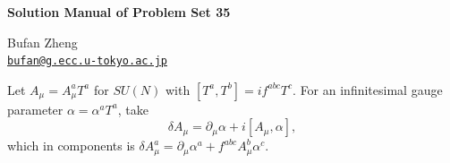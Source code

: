 \resetproblem\textsf{\textsf{}}
\begin{center}
    {\LARGE \textbf{Solution Manual of Problem Set 35} \par}
    \vspace{1em}
    {\large Bufan Zheng\\ \href{mailto:bufan@g.ecc.u-tokyo.ac.jp}{\texttt{bufan@g.ecc.u-tokyo.ac.jp}} \par}
\end{center}

\noindent Let \(A_\mu=A_\mu^aT^a\) for \(SU(N)\) with \([T^a,T^b]=if^{abc}T^c\). For an infinitesimal gauge parameter \(\alpha=\alpha^aT^a\), take
\[
    \delta A_\mu=\partial_\mu\alpha+i[A_\mu,\alpha],
\]
which in components is \(\delta A_\mu^a=\partial_\mu\alpha^a+f^{abc}A_\mu^b\alpha^c\).

